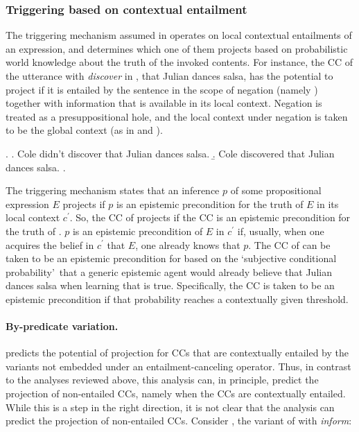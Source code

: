 \documentclass[a4paper,12pt,twoside]{article}
\begin{document}
\subsubsection{Triggering based on contextual entailment}

The triggering mechanism assumed in \citealt{schlenker_triggering_2021} operates on local contextual entailments of an expression, and determines which one of them projects based on probabilistic world knowledge about the truth of the invoked contents. For instance, the CC of the utterance with \emph{discover} in \Next[a], that Julian dances salsa, has the potential to project if it is entailed by the sentence in the scope of negation (namely \Next[b]) together with information that is available in its local context. Negation is treated as a presuppositional hole, and the local context under negation is taken to be the global context (as in  \citealt{heim_projection_1983} and \citealt{schlenker_local_2009}).

			\ex. \a. Cole didn't discover that Julian dances salsa.
				\b. Cole discovered that Julian dances salsa.
			\z.

			The triggering mechanism states that an inference $p$ of some propositional expression $E$ pro\-jects if $p$ is an epistemic precondition for the truth of $E$ in its local context $c^\prime$. So, the CC of \Last[a] projects if the CC is an epistemic precondition for the truth of \Last[b].
			$p$ is an epistemic precondition of $E$ in $c^\prime$ if, usually, when one acquires the belief in $c^\prime$ that $E$, one already knows that $p$. 
			The CC of \Last[a] can be taken to be an epistemic precondition for \Last[b] based on the \lq subjective conditional probability\rq\ that a generic epistemic agent would already believe that Julian dances salsa when learning that \Last[b] is true. Specifically, the CC is taken to be an epistemic precondition if that probability reaches a contextually given threshold.

			\paragraph{By-predicate variation.} \citealt{schlenker_triggering_2021} predicts   
   the potential of projection for CCs that are contextually entailed by the variants not embedded under an entailment-canceling operator. Thus, in contrast to the analyses reviewed above, this analysis can, in principle, predict the projection of non-entailed CCs, namely when the CCs are contextually entailed. While this is a step in the right direction, it is not clear that the analysis can predict the projection of non-entailed CCs. Consider \Next, the variant of \Last[a] with {\em inform}:
\end{document}
